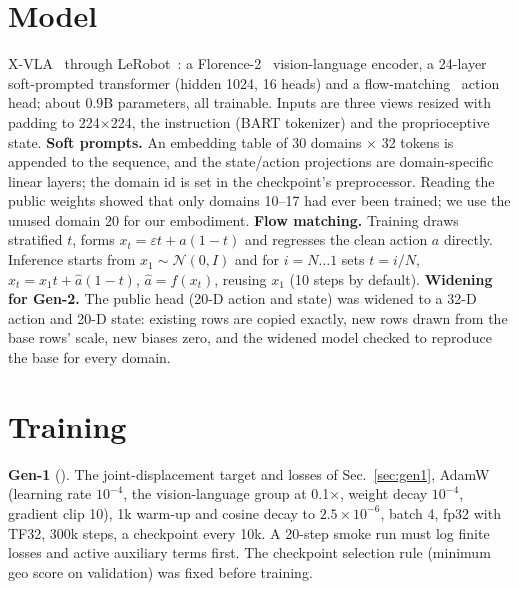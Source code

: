 \documentclass[conference,10pt]{IEEEtran}
\begin{document}
\section{Model}\label{sec:model}
X-VLA~\cite{zheng2025xvla} through LeRobot~\cite{cadene2024lerobot}: a Florence-2~\cite{xiao2024florence2} vision-language encoder,
a 24-layer soft-prompted transformer (hidden 1024, 16 heads) and a flow-matching~\cite{lipman2023flow} action head; about 0.9B
parameters, all trainable. Inputs are three views resized with padding to 224$\times$224, the instruction (BART tokenizer) and the
proprioceptive state. \textbf{Soft prompts.} An embedding table of 30 domains $\times$ 32 tokens is appended to the sequence, and the
state/action projections are domain-specific linear layers; the domain id is set in the checkpoint's preprocessor. Reading the
public weights showed that only domains 10--17 had ever been trained; we use the unused domain 20 for our embodiment.
\textbf{Flow matching.} Training draws stratified $t$, forms $x_t=\varepsilon t+a(1-t)$ and regresses the clean action $a$
directly. Inference starts from $x_1\sim\mathcal N(0,I)$ and for $i=N\dots1$ sets $t=i/N$, $x_t=x_1 t+\hat a(1-t)$, $\hat a=f(x_t)$,
reusing $x_1$ (10 steps by default). \textbf{Widening for Gen-2.} The public head (20-D action and state) was widened to a 32-D
action and 20-D state: existing rows are copied exactly, new rows drawn from the base rows' scale, new biases zero, and the widened
model checked to reproduce the base for every domain.

\section{Training}\label{sec:train}
\textbf{Gen-1} (). The joint-displacement target and losses of Sec.~\ref{sec:gen1}, AdamW (learning
rate $10^{-4}$, the vision-language group at 0.1$\times$, weight decay $10^{-4}$, gradient clip 10), 1k warm-up and cosine decay to
$2.5\times10^{-6}$, batch 4, fp32 with TF32, 300k steps, a checkpoint every 10k. A 20-step smoke run must log finite losses and
active auxiliary terms first. The checkpoint selection rule (minimum geo score on validation) was fixed before training.
\end{document}

